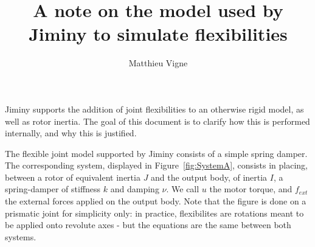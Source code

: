 \documentclass[a4paper,10pt]{article}
\title{A note on the model used by Jiminy to simulate flexibilities}
\author{Matthieu Vigne}
\begin{document}
\maketitle

Jiminy supports the addition of joint flexibilities to an otherwise rigid model, as well as rotor inertia. The goal of this document is to clarify how this is performed internally, and why this is justified. 

The flexible joint model supported by Jiminy consists of a simple spring damper. The corresponding system, displayed in Figure~\ref{fig:SystemA}, consists in placing, between a rotor of equivalent inertia $J$ and the output body, of inertia $I$, a spring-damper of stiffness $k$ and damping $\nu$. We call $u$ the motor torque, and $f_{ext}$ the external forces applied on the output body. Note that the figure is done on a prismatic joint for simplicity only: in practice, flexibilites are rotations meant to be applied onto revolute axes - but the equations are the same between both systems.
\end{document}
